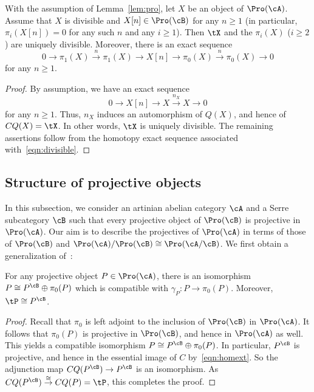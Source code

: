\begin{lemm}\label{lem:tors}
With the assumption of Lemma~\ref{lem:pro}, let $X$ be an object of $\Pro(\cA)$. Assume that $X$ is divisible and $X[n] \in \Pro(\cB)$ for any $n \geq 1$ (in particular, $\pi_i(X[n]) = 0$ for any such $n$ and any $i \geq 1$). Then $\tX$ and the $\pi_i(X)$ ($i \geq 2$) are uniquely divisible. Moreover, there is an exact sequence
\[
0 \longrightarrow \pi_1(X)
\stackrel{n}{\longrightarrow} \pi_1(X)
\longrightarrow X[n] \longrightarrow \pi_0(X)
\stackrel{n}{\longrightarrow} \pi_0(X)
\longrightarrow 0
\]
for any $n \geq 1$.
\end{lemm}


\begin{proof}
By assumption, we have an exact sequence
\begin{equation}\label{eqn:divisible}
0 \longrightarrow X[n] \longrightarrow X
\stackrel{n_X}{\longrightarrow} X \longrightarrow 0
\end{equation}
for any $n \geq 1$. Thus, $n_X$ induces an automorphism of $Q(X)$, and hence of $CQ(X) = \tX$. In other words, $\tX$ is uniquely divisible. The remaining assertions follow from the homotopy exact sequence associated with~\eqref{eqn:divisible}.
\end{proof}


\subsection{Structure of projective objects}\label{subsec:proj}

In this subsection, we consider an artinian abelian category $\cA$ and a Serre subcategory $\cB$ such that every projective object of $\Pro(\cB)$ is projective in $\Pro(\cA)$. Our aim is to describe the projectives of $\Pro(\cA)$ in terms of those of $\Pro(\cB)$ and $\Pro(\cA)/\Pro(\cB) \cong \Pro(\cA/\cB)$. We first obtain a generalization of~\cite[V.3.3.9]{DG}:


\begin{lemm}\label{lem:proj}
For any projective object $P \in \Pro(\cA)$, there is an isomorphism $P \cong P^{\cB} \oplus \pi_0(P)$ which is compatible with $\gamma_P : P \to \pi_0(P)$. Moreover, $\tP \cong P^{\cB}$.
\end{lemm}

\begin{proof}
Recall that $\pi_0$ is left adjoint to the inclusion of $\Pro(\cB)$ in $\Pro(\cA)$. It follows that $\pi_0(P)$ is projective in $\Pro(\cB)$, and hence in $\Pro(\cA)$ as well. This yields a compatible isomorphism $P \cong P^{\cB} \oplus \pi_0(P)$. In particular, $P^{\cB}$ is projective, and hence in the essential image of $C$ by~\eqref{eqn:homext}. So the adjunction map $CQ(P^{\cB}) \to P^{\cB}$ is an isomorphism. As $CQ(P^{\cB}) \stackrel{\cong}{\to} CQ(P) = \tP$, this completes the proof.
\end{proof}

